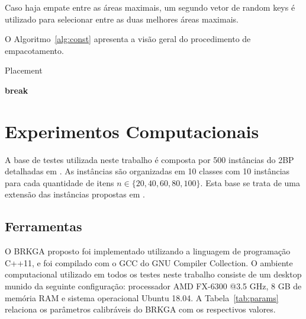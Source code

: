 \documentclass[article]{rian_article}
\begin{document}
Caso haja empate entre as áreas maximais, um segundo vetor de random keys é utilizado para selecionar entre as duas melhores áreas maximais.


O Algoritmo~\ref{alg:const} apresenta a visão geral do procedimento de empacotamento.

\begin{algorithm}[hbtp]
\caption{Placement}
\label{alg:const}
\begin{algorithmic}[1]
\footnotesize
{}
				\State \textbf{break}
			\EndIf
		\EndFor
		\Else
		\EndIf
	\EndFor
\EndProcedure
\end{algorithmic}
\end{algorithm}

\section{Experimentos Computacionais}
A base de testes utilizada neste trabalho é composta por 500 instâncias do 2BP detalhadas em \citet{martello1998}. As instâncias são organizadas em 10 classes com 10 instâncias para cada quantidade de itens ${n} \in \{20, 40, 60, 80, 100\}$. Esta base se trata de uma extensão das instâncias propostas em \citet{wang1987}.

\subsection{Ferramentas}\label{sec::ferramentas}

O BRKGA proposto foi implementado utilizando a linguagem de programação C++11, e foi compilado com o GCC do GNU Compiler Collection. O ambiente computacional utilizado em todos os testes neste trabalho consiste de um desktop munido da seguinte configuração: processador AMD FX-6300 @3.5 GHz, 8 GB de memória RAM e sistema operacional Ubuntu 18.04. A Tabela~\ref{tab:params} relaciona os parâmetros calibráveis do BRKGA com os respectivos valores.
\end{document}
